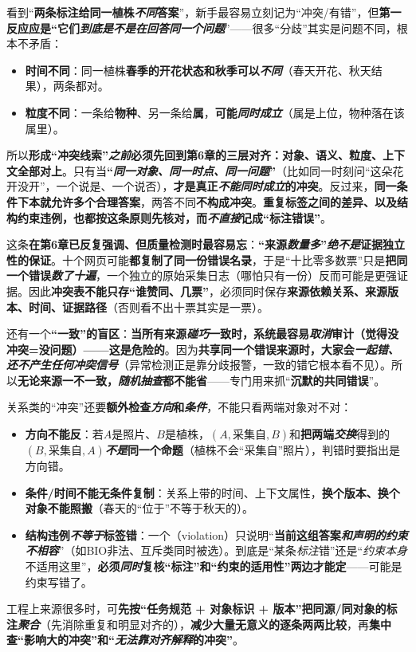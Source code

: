 看到“\textbf{两条标注给同一植株\emph{不同}答案}”，新手最容易立刻记为“冲突/有错”，但\textbf{第一反应应是“它们\emph{到底是不是在回答同一个问题}}”——很多“分歧”其实是问题不同，根本不矛盾：
\begin{itemize}\item \textbf{时间不同}：同一植株\textbf{春季的开花状态和秋季可以\emph{不同}}（春天开花、秋天结果），两条都对。\item \textbf{粒度不同}：一条给\textbf{物种}、另一条给\textbf{属}，\textbf{可能\emph{同时成立}}（属是上位，物种落在该属里）。\end{itemize}
所以\textbf{形成“冲突线索”\emph{之前}必须先回到第6章的三层对齐：对象、语义、粒度、上下文全部对上}。只有当\textbf{“\emph{同一对象、同一时点、同一问题}”}（比如同一时刻问“这朵花开没开”，一个说是、一个说否），\textbf{才是真正\emph{不能同时成立}的冲突}。反过来，\textbf{同一条件下本就允许多个合理答案}，两答不同\textbf{不构成冲突}。\textbf{重复标签之间的差异、以及结构约束违例，也都按这条原则先核对，而\emph{不直接}记成“标注错误”}。

这条\textbf{在第6章已反复强调、但质量检测时最容易忘}：\textbf{“来源\emph{数量多}”\emph{绝不是}证据独立性的保证}。十个网页可能\textbf{都复制了同一份错误名录}，于是“十比零多数票”只是\textbf{把同一个错误\emph{数了十遍}}，一个独立的原始采集日志（哪怕只有一份）反而可能是更强证据。因此\textbf{冲突表不能只存“谁赞同、几票”}，必须同时保存\textbf{来源依赖关系、来源版本、时间、证据路径}（否则看不出十票其实是一票）。

还有一个\textbf{“一致”的盲区}：\textbf{当所有来源\emph{碰巧}一致时，系统最容易\emph{取消}审计（觉得没冲突=没问题）——这是危险的}。因为\textbf{共享同一个错误来源时，大家会\emph{一起错、还不产生任何冲突信号}}（异常检测正是靠分歧报警，一致的错它根本看不见）。所以\textbf{无论来源一不一致，\emph{随机抽查}都不能省}——专门用来抓“\textbf{沉默的共同错误}”。

关系类的“冲突”还要\textbf{额外检查\emph{方向}和\emph{条件}}，不能只看两端对象对不对：
\begin{itemize}\item \textbf{方向不能反}：若$A$是照片、$B$是植株，$(A,\text{采集自},B)$和\textbf{把两端\emph{交换}}得到的$(B,\text{采集自},A)$\textbf{\emph{不是}同一个命题}（植株不会“采集自”照片），判错时要指出是方向错。\item \textbf{条件/时间不能无条件复制}：关系上带的时间、上下文属性，\textbf{换个版本、换个对象不能照搬}（春天的“位于”不等于秋天的）。\item \textbf{结构违例\emph{不等于}标签错}：一个（violation）只说明“\textbf{当前这组答案\emph{和声明的约束}\emph{不相容}}”（如BIO非法、互斥类同时被选）。到底是“某条\emph{标注}错”还是“\emph{约束本身}不适用这里”，\textbf{必须\emph{同时}复核“标注”和“约束的适用性”两边才能定}——可能是约束写错了。\end{itemize}
工程上来源很多时，可\textbf{先按“任务规范 + 对象标识 + 版本”把同源/同对象的标注\emph{聚合}}（先消除重复和明显对齐的），\textbf{减少大量无意义的逐条两两比较}，再\textbf{集中查“影响大的冲突”和“\emph{无法靠对齐解释}的冲突”}。

